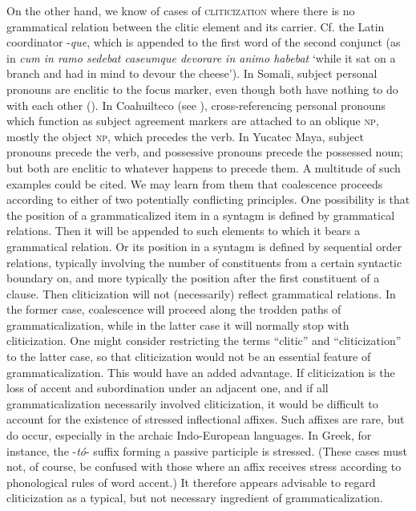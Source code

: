 On the other hand, we know of cases of \textsc{cliticization} where there is no grammatical relation between the clitic element and its carrier. Cf. the Latin coordinator -\textit{que}, which is appended to the first word of the second conjunct (as in \textit{cum in ramo sedebat caseumque devorare in animo habebat} ‘while it sat on a branch and had in mind to devour the cheese’). In Somali, subject personal pronouns are enclitic to the focus marker, even though both have nothing to do with each other (). In Coahuilteco (see \citealt{Troike1981}), cross-referencing personal pronouns which function as subject agreement markers are attached to an oblique \textsc{np}, mostly the object \textsc{np}, which precedes the verb. In Yucatec Maya, subject pronouns precede the verb, and possessive pronouns precede the possessed noun; but both are enclitic to whatever happens to precede them. A multitude of such examples could be cited. We may learn from them that coalescence proceeds according to either of two potentially conflicting principles. One possibility is that the position of a grammaticalized item in a syntagm is defined by grammatical relations. Then it will be appended to such elements to which it bears a grammatical relation. Or its position in a syntagm is defined by sequential order relations, typically involving the number of constituents from a certain syntactic boundary on, and more typically the position after the first constituent of a clause. Then cliticization will not (necessarily) reflect grammatical relations. In the former case, coalescence will proceed along the trodden paths of grammaticalization, while in the latter case it will normally stop with cliticization. One might consider restricting the terms ``clitic'' and ``cliticization'' to the latter case, so that cliticization would not be an essential feature of grammaticalization. This would have an added advantage. If cliticization is the loss of accent and subordination under an adjacent one, and if all grammaticalization necessarily involved cliticization, it would be difficult to account for the existence of stressed inflectional affixes. Such affixes are rare, but do occur, especially in the archaic Indo-European languages. In Greek, for instance, the -\textit{tó}{}- suffix forming a passive participle is stressed. (These cases must not, of course, be confused with those where an affix receives stress according to phonological rules of word accent.) It therefore appears advisable to regard cliticization as a typical, but not necessary ingredient of grammaticalization.

